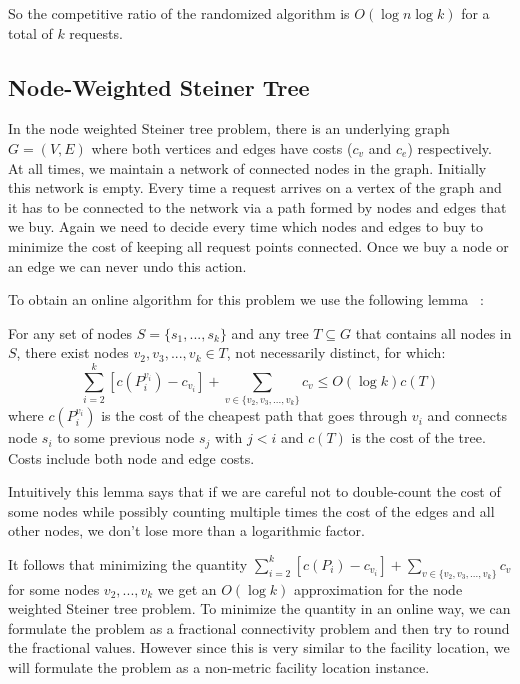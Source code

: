 So the competitive ratio of the randomized algorithm is $O(\log n \log k)$ for a total of $k$ requests.

\subsection{Node-Weighted Steiner Tree}

In the node weighted Steiner tree problem, there is an underlying graph $G=(V,E)$ where both vertices and edges have costs ($c_v$ and $c_e$) respectively. At all times, we maintain a network of connected nodes in the graph. Initially this network is empty. Every time a request arrives on a vertex of the graph and it has to be connected to the network via a path formed by nodes and edges that we buy. Again we need to decide every time which nodes and edges to buy to minimize the cost of keeping all request points connected. Once we buy a node or an edge we can never undo this action.

To obtain an online algorithm for this problem we use the following lemma ~\cite{naor11:node-weighted-steiner-tree}:

\begin{lemma}
For any set of nodes $S = \{s_1,...,s_k\}$ and any tree $T \subseteq G$ that contains all nodes in $S$, 
there exist nodes $v_2, v_3, ... , v_k \in T$, not necessarily distinct, for which:
\[ \sum_{i=2}^k [c(P^{v_i}_i) - c_{v_i}] + \sum_{v \in \{v_2, v_3, ... , v_k\}} c_{v} \le O(\log k) c(T) \]
where $c(P^{v_i}_i)$ is the cost of the cheapest path that goes through $v_i$ and connects node $s_i$ to some previous node $s_j$ with $j<i$ and $c(T)$ is the cost of the tree. Costs include both node and edge costs.
\end{lemma}

Intuitively this lemma says that if we are careful not to double-count the cost of some nodes while possibly counting multiple times the cost of the edges and all other nodes, we don't lose more than a logarithmic factor.

It follows that minimizing the quantity $\sum_{i=2}^k [c(P_i) - c_{v_i}] + \sum_{v \in \{v_2, v_3, ... , v_k\}} c_{v}$ for some nodes $v_2,...,v_k$ we get an $O(\log k)$ approximation for the node weighted Steiner tree problem. To minimize the quantity in an online way, we can formulate the problem as a fractional connectivity problem and then try to round the fractional values. However since this is very similar to the facility location, we will formulate the problem as a non-metric facility location instance.

